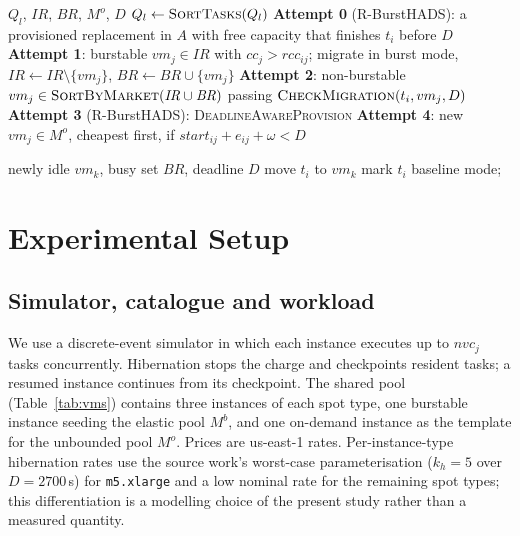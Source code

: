 \documentclass[conference]{IEEEtran}
\begin{document}
\begin{algorithm}[t]
\caption{Burst migration procedure}
\label{alg:migrate}
\begin{algorithmic}[1]
\REQUIRE $Q_l$, $\mathit{IR}$, $\mathit{BR}$, $M^{o}$, $D$
\STATE $Q_l \leftarrow \textsc{SortTasks}(Q_l)$ 
  \STATE \textbf{Attempt 0} (R-BurstHADS): a provisioned replacement in $A$ with
         free capacity that finishes $t_i$ before $D$
  \STATE \textbf{Attempt 1}: burstable $vm_j \in \mathit{IR}$ with
         $\mathit{cc}_j > \mathit{rcc}_{ij}$; migrate in burst mode,
         $\mathit{IR}\!\leftarrow\!\mathit{IR}\setminus\{vm_j\}$,
         $\mathit{BR}\!\leftarrow\!\mathit{BR}\cup\{vm_j\}$
  \STATE \textbf{Attempt 2}: non-burstable $vm_j \in \textsc{SortByMarket}(\mathit{IR}\cup \mathit{BR})$
         passing $\textsc{CheckMigration}(t_i,vm_j,D)$
  \STATE \textbf{Attempt 3} (R-BurstHADS): \textsc{DeadlineAwareProvision}
  \STATE \textbf{Attempt 4}: new $vm_j \in M^{o}$, cheapest first, if
         $\mathit{start}_{ij} + e_{ij} + \omega < D$
\ENDFOR
\end{algorithmic}
\end{algorithm}

\begin{algorithm}[t]
\caption{Work stealing}
\label{alg:steal}
\begin{algorithmic}[1]
\REQUIRE newly idle $vm_k$, busy set $\mathit{BR}$, deadline $D$
      \STATE move $t_i$ to $vm_k$
        \STATE mark $t_i$ baseline mode; \RETURN {}
      \ENDIF
    \ENDIF
  \ENDFOR
\ENDFOR
\end{algorithmic}
\end{algorithm}

\section{Experimental Setup}
\label{sec:setup}

\subsection{Simulator, catalogue and workload}

We use a discrete-event simulator in which each instance executes up to
$\mathit{nvc}_j$ tasks concurrently. Hibernation stops the charge and
checkpoints resident tasks; a resumed instance continues from its checkpoint.
The shared pool (Table~\ref{tab:vms}) contains three instances of each spot
type, one burstable instance seeding the elastic pool $M^{b}$, and one
on-demand instance as the template for the unbounded pool $M^{o}$. Prices are
us-east-1 rates. Per-instance-type hibernation rates use the source work's
worst-case parameterisation ($k_h=5$ over $D=2700$\,s) for \texttt{m5.xlarge}
and a low nominal rate for the remaining spot types; this differentiation is a
modelling choice of the present study rather than a measured quantity.
\end{document}

